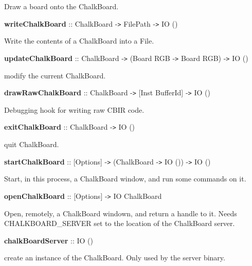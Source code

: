 \hspace{0.05\textwidth}\begin{minipage}{0.9\textwidth}Draw a board onto the ChalkBoard.\end{minipage}

 

{{\bf writeChalkBoard} :: ChalkBoard -{\tt >} FilePath -{\tt >} IO ()}

\hspace{0.05\textwidth}\begin{minipage}{0.9\textwidth}Write the contents of a ChalkBoard into a File.\end{minipage}

 

{{\bf updateChalkBoard} :: ChalkBoard -{\tt >} (Board RGB -{\tt >} Board RGB) -{\tt >} IO ()}

\hspace{0.05\textwidth}\begin{minipage}{0.9\textwidth}modify the current ChalkBoard.\end{minipage}

 

{{\bf drawRawChalkBoard} :: ChalkBoard -{\tt >} [Inst BufferId] -{\tt >} IO ()}

\hspace{0.05\textwidth}\begin{minipage}{0.9\textwidth}Debugging hook for writing raw CBIR code.\end{minipage}

 

{{\bf exitChalkBoard} :: ChalkBoard -{\tt >} IO ()}

\hspace{0.05\textwidth}\begin{minipage}{0.9\textwidth}quit ChalkBoard.\end{minipage}

 

{{\bf startChalkBoard} :: [Options] -{\tt >} (ChalkBoard -{\tt >} IO ()) -{\tt >} IO ()}

\hspace{0.05\textwidth}\begin{minipage}{0.9\textwidth}Start, in this process, a ChalkBoard window, and run some commands on it.\end{minipage}

 

{{\bf openChalkBoard} :: [Options] -{\tt >} IO ChalkBoard}

\hspace{0.05\textwidth}\begin{minipage}{0.9\textwidth}Open, remotely, a ChalkBoard windown, and return a handle to it. Needs CHALKBOARD\_SERVER set to the location of the ChalkBoard server.\end{minipage}

 

{{\bf chalkBoardServer} :: IO ()}

\hspace{0.05\textwidth}\begin{minipage}{0.9\textwidth}create an instance of the ChalkBoard. Only used by the server binary.\end{minipage}

 

 

